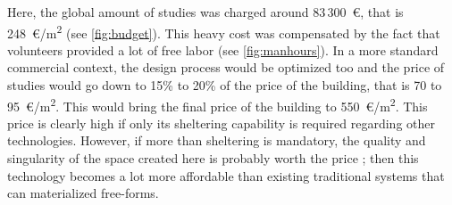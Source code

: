 Here, the global amount of studies was charged around 83\,300~€, that is 248~€/m\textsuperscript{2} (see \cref{fig:budget}). This heavy cost was compensated by the fact that volunteers provided a lot of free labor (see \cref{fig:manhours}). In a more standard commercial context, the design process would be optimized too and the price of studies would go down to 15\% to 20\% of the price of the building, that is 70 to 95~€/m\textsuperscript{2}. This would bring the final price of the building to 550~€/m\textsuperscript{2}. This price is clearly high if only its sheltering capability is required regarding other technologies. However, if more than sheltering is mandatory, the quality and singularity of the space created here is probably worth the price ; then this technology becomes a lot more affordable than existing traditional systems that can materialized free-forms.


